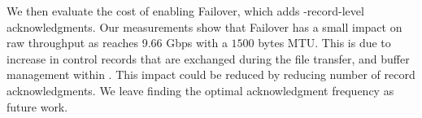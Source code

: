 
We then evaluate the cost of enabling Failover, which adds \tcpls-record-level 
acknowledgments. %
Our measurements show that Failover has a small impact on raw throughput as
\tcpls reaches 9.66 Gbps with a $1500$ bytes MTU.
This is due to increase in control records that are exchanged during the file 
transfer, and buffer management within \tcpls.
This impact could be reduced by reducing number of record acknowledgments. We 
leave finding the optimal acknowledgment frequency as future work.



